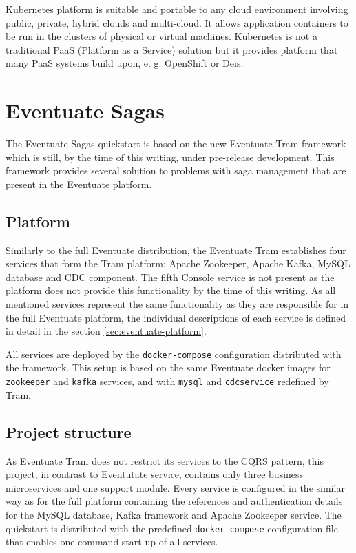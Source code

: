 \documentclass[oneside,
  digital, %
  table,   %
  nolof,     %
  nolot,     %
]{fithesis3}
\begin{document}
Kubernetes platform is suitable and portable to any cloud environment involving public, private, hybrid clouds and multi-cloud. It allows application containers to be run in the clusters of physical or virtual machines. Kubernetes is not a traditional PaaS (Platform as a Service) solution but it provides platform that many PaaS systems build upon, e. g. OpenShift or Deis.


\section{Eventuate Sagas}

The Eventuate Sagas quickstart is based on the new Eventuate Tram framework which is still, by the time of this writing, under pre-release development. This framework provides several solution to problems with saga management that are present in the Eventuate platform.

\subsection{Platform}

Similarly to the full Eventuate distribution, the Eventuate Tram establishes four services that form the Tram platform: Apache Zookeeper, Apache Kafka, MySQL database and CDC component. The fifth Console service is not present as the platform does not provide this functionality by the time of this writing. As all mentioned services represent the same functionality as they are responsible for in the full Eventuate platform, the individual descriptions of each service is defined in detail in the section \ref{sec:eventuate-platform}.  

All services are deployed by the \texttt{docker-compose} configuration distributed with the framework. This setup is based on the same Eventuate docker images for \texttt{zookeeper} and \texttt{kafka} services, and with \texttt{mysql} and \texttt{cdcservice} redefined by Tram.

\subsection{Project structure}

As Eventuate Tram does not restrict its services to the CQRS pattern, this project, in contrast to Eventutate service, contains only three business microservices and one support module. Every service is configured in the similar way as for the full platform containing the references and authentication details for the MySQL database, Kafka framework and Apache Zookeeper service. The quickstart is distributed with the predefined \texttt{docker-compose} configuration file that enables one command start up of all services.
\end{document}
